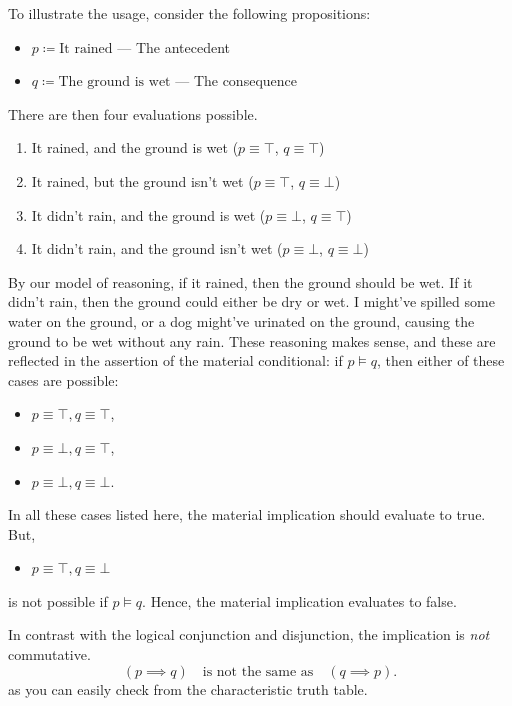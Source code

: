 To illustrate the usage, consider the following propositions:
\begin{itemize}[noitemsep]
  \item $p \coloneqq \textrm{It rained}$ --- The antecedent
  \item $q \coloneqq \textrm{The ground is wet}$ --- The consequence
\end{itemize}
There are then four evaluations possible.
\begin{enumerate}[noitemsep]
  \item It rained, and the ground is wet (\(p \equiv \top\), \(q \equiv \top\))
  \item It rained, but the ground isn't wet (\(p \equiv \top\), \(q \equiv \bot\))
  \item It didn't rain, and the ground is wet (\(p \equiv \bot\), \(q \equiv \top\))
  \item It didn't rain, and the ground isn't wet (\(p \equiv \bot\), \(q \equiv \bot\))
\end{enumerate}
By our model of reasoning, if it rained, then the ground should be wet. If it didn't rain, then the ground could either be dry or wet. I might've spilled some water on the ground, or a dog might've urinated on the ground, causing the ground to be wet without any rain. These reasoning makes sense, and these are reflected in the assertion of the material conditional: if \(p \models q\), then either of these cases are possible:
\begin{itemize}[noitemsep]
  \item \(p \equiv \top, q \equiv \top\),
  \item \(p \equiv \bot, q \equiv \top\),
  \item \(p \equiv \bot, q \equiv \bot\).
\end{itemize}
In all these cases listed here, the material implication should evaluate to true. But,
\begin{itemize}
  \item \(p \equiv \top, q \equiv \bot\)
\end{itemize}
is not possible if \(p \models q\). Hence, the material implication evaluates to false.

In contrast with the logical conjunction and disjunction, the implication is \emph{not} commutative.
\begin{equation}
  (p \implies q) \quad\textrm{is not the same as}\quad (q \implies p).
\end{equation}
as you can easily check from the characteristic truth table.

